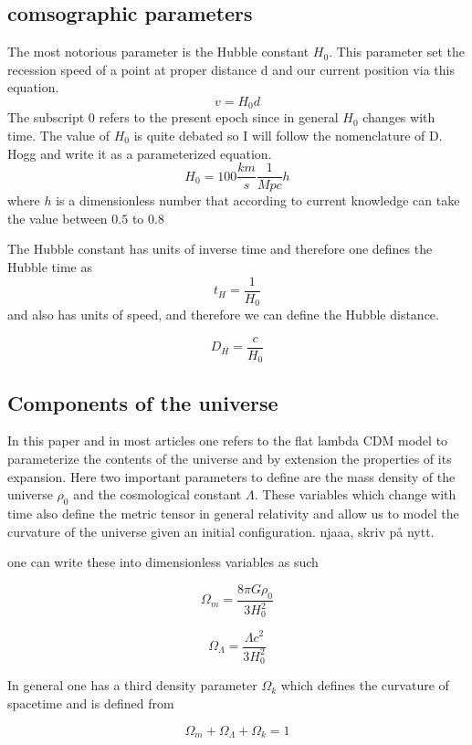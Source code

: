 \documentclass[11pt]{article}
\begin{document}
\subsection{comsographic parameters}

The most notorious parameter is the Hubble constant $H_0$. This parameter set the recession speed of a point at proper distance d and our current position via this equation.
\begin{equation}
    v = H_0 d 
\end{equation}
The subscript $0$ refers to the present epoch since in general $H_0$ changes with time. The value of $H_0$ is quite debated so I will  follow the nomenclature of D. Hogg and write it as a parameterized equation. 
$$
H_0= 100\frac{km}{s}\frac{1}{Mpc} h 
$$
where $h$ is a dimensionless number that according to current knowledge  can take the value between $0.5$ to $0.8$  

The Hubble constant has units of inverse time and therefore one defines the Hubble time as 
$$
t_H = \frac{1}{H_0}
$$
and also has units of speed, and therefore we can define the Hubble distance. 

$$
D_H = \frac{c}{H_0}
$$

\subsection{Components of the universe}
In this paper and in most articles one refers to the flat lambda CDM model to parameterize the contents of the universe and by extension the properties of its expansion. Here two important parameters to define are the mass density of the universe $\rho_0$ and the cosmological constant $\Lambda$. These variables which change with time also define the metric tensor in general relativity and allow us to model the curvature of the universe given an initial configuration.  njaaa, skriv på nytt. 

one can write these into dimensionless variables as such

$$
\Omega_m = \frac{8\pi G\rho_0}{3H_0^2}
$$

$$
\Omega_\Lambda = \frac{\Lambda c^2}{3H_0^2}
$$



In general one has a third density parameter $\Omega_k$ which defines the curvature of spacetime and is defined from 

$$
\Omega_m + \Omega_\Lambda + \Omega_k = 1
$$
\end{document}
